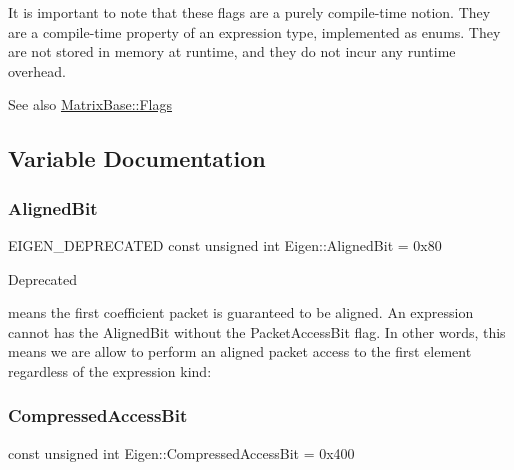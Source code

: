 It is important to note that these flags are a purely compile-\/time notion. They are a compile-\/time property of an expression type, implemented as enum\textquotesingle{}s. They are not stored in memory at runtime, and they do not incur any runtime overhead.

\begin{DoxySeeAlso}{See also}
\mbox{\hyperlink{class_eigen_1_1_dense_base_a86241c772c74c04eeeb0480b99c5ab77a7392c9b2ad41ba3c16fdc5306c04d581}{Matrix\+Base\+::\+Flags}} 
\end{DoxySeeAlso}


\subsection{Variable Documentation}
\mbox{\label{group__flags_gac5795adacd266512a26890973503ed88}} 
\subsubsection{\texorpdfstring{AlignedBit}{AlignedBit}}
{\footnotesize\ttfamily E\+I\+G\+E\+N\+\_\+\+D\+E\+P\+R\+E\+C\+A\+T\+ED const unsigned int Eigen\+::\+Aligned\+Bit = 0x80}

\begin{DoxyRefDesc}{Deprecated}
\item[\mbox{\hyperlink{deprecated__deprecated000013}{Deprecated}}]means the first coefficient packet is guaranteed to be aligned. An expression cannot has the Aligned\+Bit without the Packet\+Access\+Bit flag. In other words, this means we are allow to perform an aligned packet access to the first element regardless of the expression kind\+: \end{DoxyRefDesc}

\begin{DoxyCode}{0}
\end{DoxyCode}
 \mbox{\label{group__flags_gaed0244284da47a2b8661261431173caf}} 
\subsubsection{\texorpdfstring{CompressedAccessBit}{CompressedAccessBit}}
{\footnotesize\ttfamily const unsigned int Eigen\+::\+Compressed\+Access\+Bit = 0x400}

